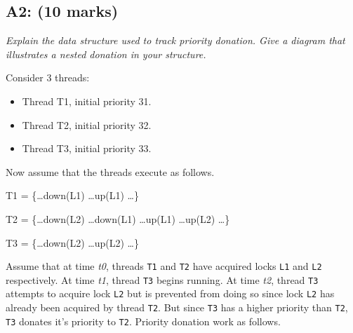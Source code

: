 \documentclass{article}
\begin{document}
\subsection*{A2: (10 marks) }

\textit{Explain the data structure used to track priority donation. Give a diagram that illustrates a nested donation in your structure.}

Consider 3 threads:

\begin{itemize}
\item Thread T1, initial priority 31.
\item Thread T2, initial priority 32.
\item Thread T3, initial priority 33.
\end{itemize}

Now assume that the threads execute as follows.

\begin{center}
T1 = \{\ldots down(L1) \ldots up(L1) \ldots \}
\end{center}
\begin{center}
T2 = \{\ldots down(L2) \ldots down(L1) \ldots up(L1) \ldots up(L2) \ldots \}
\end{center}
\begin{center}
T3 = \{\ldots down(L2) \ldots up(L2) \ldots \}
\end{center}

Assume that at time \textit{t0}, threads \texttt{T1} and \texttt{T2} have acquired locks \texttt{L1} and \texttt{L2} respectively. At time \textit{t1}, thread \texttt{T3} begins running. At time \textit{t2}, thread \texttt{T3} attempts to acquire lock \texttt{L2} but is prevented from doing so since lock \texttt{L2} has already been acquired by thread \texttt{T2}. But since \texttt{T3} has a higher priority than \texttt{T2}, \texttt{T3} donates it's priority to \texttt{T2}. Priority donation work as follows.
\end{document}
